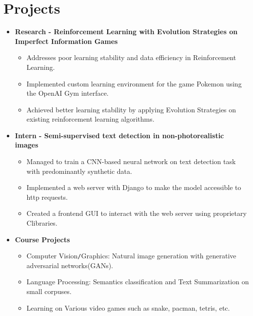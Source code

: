 \section{Projects}
\vspace{5pt}
\begin{itemize}[leftmargin=*]
    \item{\textbf{Research - Reinforcement Learning with Evolution Strategies on Imperfect Information Games}}
        \begin{itemize}
                \vspace{-5pt}
                \item Addresses poor learning stability and data efficiency in Reinforcement Learning.
                \item Implemented custom learning environment for the game Pokemon using the OpenAI Gym interface. 
                \item Achieved better learning stability by applying Evolution Strategies on existing reinforcement learning algorithms.
        \end{itemize}
    \vspace{-10pt}
    \item{\textbf{Intern - Semi-supervised text detection in non-photorealistic images}}
        \begin{itemize}
                \vspace{-5pt}
                \item Managed to train a CNN-based neural network on text detection task with predominantly synthetic data.
                \item Implemented a web server with Django to make the model accessible to http requests.
                \item Created a frontend GUI to interact with the web server using proprietary C\Plus\Pluss libraries.
        \end{itemize}
    \vspace{-10pt}
    \item{\textbf{Course Projects}}
        \begin{itemize}
                \vspace{-5pt}
                \item Computer Vision\texttt{/}Graphics: Natural image generation with generative adversarial networks(GANs).
                \item Language Processing: Semantics classification and Text Summarization on small corpuses.
                \item Learning on Various video games such as snake, pacman, tetris, etc.
        \end{itemize}
\end{itemize}
\vspace{5pt}

